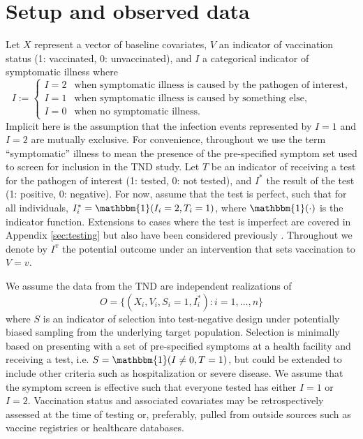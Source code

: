 \documentclass[11pt]{article}
\begin{document}
\section{Setup and observed data} \label{sec:setup}
Let $X$ represent a vector of baseline covariates, $V$ an indicator of vaccination status (1: vaccinated, 0: unvaccinated), and $I$ a categorical indicator of symptomatic illness where
        $$I := \begin{cases} 
        I = 2 & \text{when symptomatic illness is caused by the pathogen of interest}, \\
        I = 1 & \text{when symptomatic illness is caused by something else}, \\
        I = 0 & \text{when no symptomatic illness}.
        \end{cases}$$
 Implicit here is the assumption that the infection events represented by $I = 1$ and $I = 2$ are mutually exclusive. For convenience, throughout we use the term ``symptomatic'' illness to mean the presence of the pre-specified symptom set used to screen for inclusion in the TND study. Let $T$ be an indicator of receiving a test for the pathogen of interest (1: tested, 0: not tested), and $I^*$ the result of the test (1: positive, 0: negative). For now, assume that the test is perfect, such that for all individuals, $I^*_i = \mathbbm{1}(I_i = 2, T_i = 1)$, where $\mathbbm{1}(\cdot)$ is the indicator function. Extensions to cases where the test is imperfect are covered in Appendix \ref{sec:testing} but also have been considered previously \cite{jackson2015effects, sullivan_theoretical_2016}. Throughout we denote by $I^v$ the potential outcome under an intervention that sets vaccination to $V=v$. 
    
We assume the data from the TND are independent realizations of 
$$O = \{(X_i, V_i, S_i = 1, I^*_i) : i = 1, \ldots, n\}$$
where $S$ is an indicator of selection into test-negative design under potentially biased sampling from the underlying target population. Selection is minimally based on presenting with a set of pre-specified symptoms at a health facility and receiving a test, i.e. $S = \mathbbm{1}(I \neq 0, T = 1)$, but could be extended to include other criteria such as hospitalization or severe disease. We assume that the symptom screen is effective such that everyone tested has either $I=1$ or $I=2$. Vaccination status and associated covariates may be retrospectively assessed at the time of testing or, preferably, pulled from outside sources such as vaccine registries or healthcare databases. 
\end{document}
